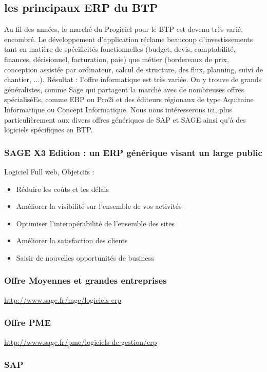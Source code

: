 		\subsection{les principaux ERP du BTP}
		Au fil des années, le marché du Progiciel pour le BTP est devenu très varié, encombré. 
Le développement d'application réclame beaucoup d'investissements tant en matière de spécificités fonctionnelles (budget, devis, comptabilité, finances, décisionnel, facturation, paie) que métier (bordereaux de prix, conception assistée par ordinateur, calcul de structure, des flux, planning, suivi de chantier, ...). 
Résultat : l'offre informatique est très variée. On y trouve de grands généralistes, comme Sage qui partagent la marché avec de nombreuses offres spécialiséEs, comme EBP ou Pro2i et des éditeurs régionaux de type Aquitaine Informatique ou Concept Informatique.
Nous nous intéresserons ici, plus particulièrement aux divers offres génériques de SAP et SAGE ainsi qu'à des logiciels spécifiques en BTP.
				\subsubsection{SAGE X3 Edition : un ERP générique visant un large public}
						Logiciel Full web,
						Objetcifs :
						\begin{itemize}
						    \item Réduire les coûts et les délais
						    \item Améliorer la visibilité sur l'ensemble de vos activités
							\item Optimiser l'interopérabilité de l'ensemble des sites
						    \item Améliorer la satisfaction des clients
							\item Saisir de nouvelles opportunités de business
						\end{itemize}

						\subsubsection{Offre Moyennes et grandes entreprises}
								\url{http://www.sage.fr/mge/logiciels-erp}
								\subsubsection{Offre PME}
								\url{http://www.sage.fr/pme/logiciels-de-gestion/erp}

				\subsubsection{SAP}

